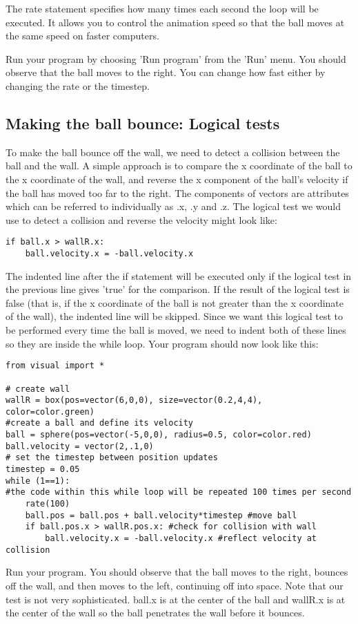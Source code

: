\documentclass[a4paper]{letter}
\begin{document}
The rate statement specifies how many times each second the loop will be executed. 
It allows you to control the animation speed so that the ball moves at the same speed 
on faster computers.

Run your program by choosing 'Run program' from the 'Run' menu.  
You should observe that the ball moves to the right. 
You can change how fast either by changing the rate or the timestep. 

\subsection{Making the ball bounce: Logical tests}
To make the ball bounce off the wall, we need to detect a collision between the ball and the wall. 
A simple approach is to compare the x coordinate of the ball to the x coordinate of the wall, 
and reverse the x component of the ball's velocity if the ball has moved too far to the right. 
The components of vectors are attributes which can be referred to individually as .x, .y and .z.
The logical test we would use to detect a collision and reverse the velocity might look like: 
{\color{code}\begin{verbatim}
if ball.x > wallR.x: 
    ball.velocity.x = -ball.velocity.x 
\end{verbatim}}
The indented line after the if statement will be executed only if the 
logical test in the previous line gives 'true' for the comparison. 
If the result of the logical test is false 
(that is, if the x coordinate of the ball is not greater than the x coordinate of the wall), 
the indented line will be skipped. 
Since we want this logical test to be performed every time the ball is moved, 
we need to indent both of these lines so they are inside the while loop. 
Your program should now look like this: 
{\color{code}\begin{verbatim}
from visual import * 

# create wall
wallR = box(pos=vector(6,0,0), size=vector(0.2,4,4), color=color.green) 
#create a ball and define its velocity
ball = sphere(pos=vector(-5,0,0), radius=0.5, color=color.red) 
ball.velocity = vector(2,.1,0) 
# set the timestep between position updates
timestep = 0.05 
while (1==1): 
#the code within this while loop will be repeated 100 times per second
    rate(100) 
    ball.pos = ball.pos + ball.velocity*timestep #move ball
    if ball.pos.x > wallR.pos.x: #check for collision with wall
        ball.velocity.x = -ball.velocity.x #reflect velocity at collision
\end{verbatim}}
Run your program. 
You should observe that the ball moves to the right, bounces off the wall,
and then moves to the left, continuing off into space. 
Note that our test is not very sophisticated. 
{\color{code}ball.x} is at the center of the ball 
and wallR.x is at the center of the wall so the ball penetrates the wall before it bounces. 
\end{document}
